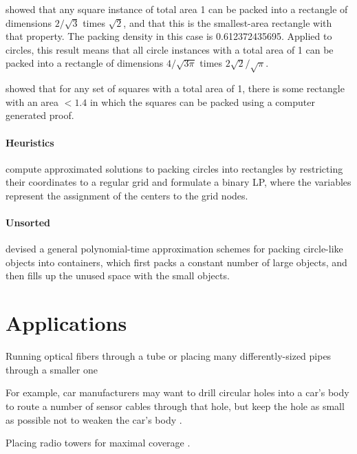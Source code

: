 \textcite{KK1975optimal} showed that any square instance of total area 1 can be packed into a rectangle of dimensions $2/\sqrt{3}$ times $\sqrt{2}$, and that this is the smallest-area rectangle with that property. The packing density in this case is 0.612372435695. Applied to circles, this result means that all circle instances with a total area of 1 can be packed into a rectangle of dimensions $4/\sqrt{3\pi}$ times $2\sqrt{2}/\sqrt{\pi}$.

\textcite{hougardy2011packing} showed that for any set of squares with a total area of 1, there is some rectangle with an area $< 1.4$ in which the squares can be packed using a computer generated proof.


\paragraph{Heuristics}

\textcite{LIE2014approximate} compute approximated solutions to packing circles into rectangles by restricting their coordinates to a regular grid and formulate a binary LP, where the variables represent the assignment of the centers to the grid nodes.

\paragraph{Unsorted}

\textcite{MPSSW2014polynomial} devised a general polynomial-time approximation schemes for packing circle-like objects into containers, which first packs a constant number of large objects, and then fills up the unused space with the small objects.

\section{Applications}

Running optical fibers through a tube or placing many differently-sized pipes through a smaller one \parencite{WHZX2002improved}

For example, car manufacturers may want to drill circular holes into a car's body to route a number of sensor cables through that hole, but keep the hole as small as possible not to weaken the car's body \cite{SSSKK2004disk}.

Placing radio towers for maximal coverage \parencite{SMCSCG2007new}.

